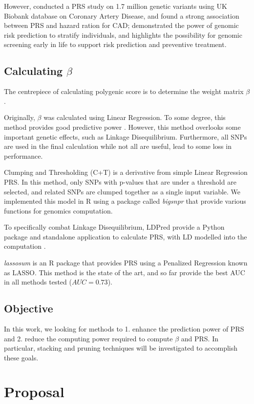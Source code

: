 \documentclass{article}
\begin{document}
However, \cite{Inouye1883} conducted a PRS study on 1.7 million genetic
variants using UK Biobank database on Coronary Artery Disease, and found
a strong association between PRS and hazard ration for CAD; demonstrated
the power of genomic risk prediction to stratify individuals, and highlights the
possibility for genomic screening early in life to support risk prediction and
preventive treatment.

\subsection{Calculating $\beta$}
The centrepiece of calculating polygenic score is to determine the weight matrix $\beta$.

Originally, $\beta$ was calculated using Linear Regression. To some degree, this method
provides good predictive power \cite{Dudbridge2013}. However, this method overlooks some 
important genetic effects, such as Linkage Disequilibrium. Furthermore, all SNPs are 
used in the final calculation while not all are useful, lead to some loss in performance.

Clumping and Thresholding (C+T) is a derivative from simple Linear Regression PRS. 
In this method, only SNPs with p-values that are under a threshold are selected, and related SNPs are clumped together as a single input variable. 
We implemented this model in R using a package called \textit{bigsnpr} \cite{bigsnpr} that provide various functions for genomics 
computation.

To specifically combat Linkage Disequilibrium, LDPred provide a Python package and standalone 
application to calculate PRS, with LD modelled into the computation \cite{LDpred}.

\textit{lassosum} \cite{doi:10.1002/gepi.22050} is an R package that provides PRS using a Penalized Regression known as LASSO. 
This method is the state of the art, and so far provide the best AUC in all methods tested ($AUC = 0.73$).

\subsection{Objective}

In this work, we looking for methods to 1. enhance the prediction power of PRS and 2. reduce the computing power required to 
compute $\beta$ and PRS. In particular, stacking and pruning techniques will be investigated to accomplish these goals.

\section{Proposal}
\end{document}
